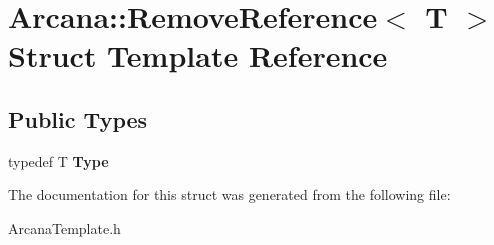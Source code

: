 \hypertarget{struct_arcana_1_1_remove_reference}{}\section{Arcana\+:\+:Remove\+Reference$<$ T $>$ Struct Template Reference}
\label{struct_arcana_1_1_remove_reference}
\subsection*{Public Types}
\begin{DoxyCompactItemize}
\item 
\mbox{\label{struct_arcana_1_1_remove_reference_a906acbdca72d0c56e200b55fe0217a32}} 
typedef T {\bfseries Type}
\end{DoxyCompactItemize}


The documentation for this struct was generated from the following file\+:\begin{DoxyCompactItemize}
\item 
Arcana\+Template.\+h\end{DoxyCompactItemize}
